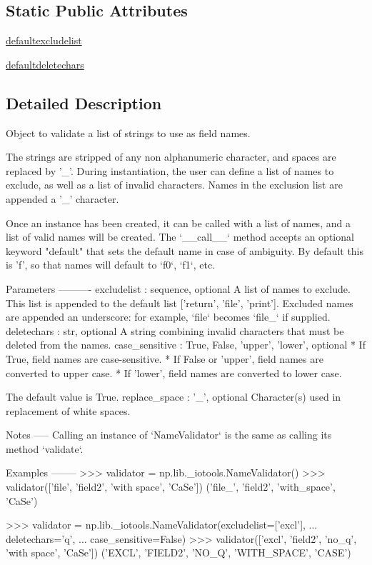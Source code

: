\subsection*{Static Public Attributes}
\begin{DoxyCompactItemize}
\item 
\hyperlink{classnumpy_1_1lib_1_1__iotools_1_1NameValidator_ad138c05d8d78ec5dca1aae4fa7547ffb}{defaultexcludelist}
\item 
\hyperlink{classnumpy_1_1lib_1_1__iotools_1_1NameValidator_a25e444d6c4ace7882608a9217f475c34}{defaultdeletechars}
\end{DoxyCompactItemize}


\subsection{Detailed Description}
\begin{DoxyVerb}Object to validate a list of strings to use as field names.

The strings are stripped of any non alphanumeric character, and spaces
are replaced by '_'. During instantiation, the user can define a list
of names to exclude, as well as a list of invalid characters. Names in
the exclusion list are appended a '_' character.

Once an instance has been created, it can be called with a list of
names, and a list of valid names will be created.  The `__call__`
method accepts an optional keyword "default" that sets the default name
in case of ambiguity. By default this is 'f', so that names will
default to `f0`, `f1`, etc.

Parameters
----------
excludelist : sequence, optional
    A list of names to exclude. This list is appended to the default
    list ['return', 'file', 'print']. Excluded names are appended an
    underscore: for example, `file` becomes `file_` if supplied.
deletechars : str, optional
    A string combining invalid characters that must be deleted from the
    names.
case_sensitive : {True, False, 'upper', 'lower'}, optional
    * If True, field names are case-sensitive.
    * If False or 'upper', field names are converted to upper case.
    * If 'lower', field names are converted to lower case.

    The default value is True.
replace_space : '_', optional
    Character(s) used in replacement of white spaces.

Notes
-----
Calling an instance of `NameValidator` is the same as calling its
method `validate`.

Examples
--------
>>> validator = np.lib._iotools.NameValidator()
>>> validator(['file', 'field2', 'with space', 'CaSe'])
('file_', 'field2', 'with_space', 'CaSe')

>>> validator = np.lib._iotools.NameValidator(excludelist=['excl'],
...                                           deletechars='q',
...                                           case_sensitive=False)
>>> validator(['excl', 'field2', 'no_q', 'with space', 'CaSe'])
('EXCL', 'FIELD2', 'NO_Q', 'WITH_SPACE', 'CASE')\end{DoxyVerb}
 

